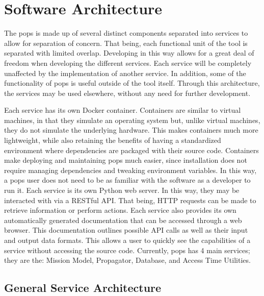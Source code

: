 \glsresetall{} 

\chapter{Software Architecture}\label{chap:architecture}


The \gls{pops} is made up of several distinct components separated into
services to allow for separation of concern. That being, each functional unit
of the tool is separated with limited overlap. Developing in this way allows
for a great deal of freedom when developing the different services. Each
service will be completely unaffected by the implementation of another service.
In addition, some of the functionality of \gls{pops} is useful outside of the
tool itself.  Through this architecture, the services may be used elsewhere,
without any need for further development.  

Each service has its own Docker container. Containers are similar to virtual
machines, in that they simulate an operating system but, unlike virtual
machines, they do not simulate the underlying hardware. This makes containers
much more lightweight, while also retaining the benefits of having a
standardized environment where dependencies are packaged with their source
code. Containers make deploying and maintaining \gls{pops} much easier, since
installation does not require managing dependencies and tweaking environment
variables. In this way, a \gls{pops} user does not need to be as familiar with
the software as a developer to run it.  Each service is its own Python web
server. In this way, they may be interacted with via a RESTful API. That being,
HTTP requests can be made to retrieve information or perform actions. Each
service also provides its own automatically generated documentation that can be
accessed through a web browser. This documentation outlines possible API calls
as well as their input and output data formats.  This allows a user to quickly
see the capabilities of a service without accessing the source code. Currently,
\gls{pops} has 4 main services; they are the: Mission Model, Propagator,
Database, and Access Time Utilities.


\section{General Service Architecture}

